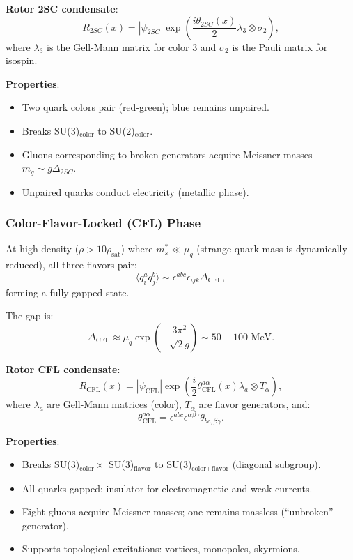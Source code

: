 \documentclass[12pt,a4paper]{article}
\theoremstyle{definition}
\theoremstyle{remark}
\begin{document}
\textbf{Rotor 2SC condensate}:
\begin{equation}
R_{2SC}(x) = |\psi_{2SC}| \exp\left(\frac{i\theta_{2SC}(x)}{2} \lambda_3 \otimes \sigma_2\right),
\end{equation}
where $\lambda_3$ is the Gell-Mann matrix for color 3 and $\sigma_2$ is the Pauli matrix for isospin.

\textbf{Properties}:
\begin{itemize}
\item Two quark colors pair (red-green); blue remains unpaired.
\item Breaks SU(3)$_{\text{color}}$ to SU(2)$_{\text{color}}$.
\item Gluons corresponding to broken generators acquire Meissner masses $m_g \sim g\Delta_{2SC}$.
\item Unpaired quarks conduct electricity (metallic phase).
\end{itemize}

\subsubsection{Color-Flavor-Locked (CFL) Phase}

At high density ($\rho > 10 \rho_{\text{sat}}$) where $m_s^* \ll \mu_q$ (strange quark mass is dynamically reduced), all three flavors pair:
\begin{equation}
\langle q_i^a q_j^b \rangle \sim \epsilon^{abc} \epsilon_{ijk} \Delta_{\text{CFL}},
\end{equation}
forming a fully gapped state.

The gap is:
\begin{equation}
\Delta_{\text{CFL}} \approx \mu_q \exp\left(-\frac{3\pi^2}{\sqrt{2} g}\right) \sim 50-100 \text{ MeV}.
\end{equation}

\textbf{Rotor CFL condensate}:
\begin{equation}
R_{\text{CFL}}(x) = |\psi_{\text{CFL}}| \exp\left(\frac{i}{2} \theta_{\text{CFL}}^{a\alpha}(x) \lambda_a \otimes T_\alpha\right),
\end{equation}
where $\lambda_a$ are Gell-Mann matrices (color), $T_\alpha$ are flavor generators, and:
\begin{equation}
\theta_{\text{CFL}}^{a\alpha} = \epsilon^{abc} \epsilon^{\alpha\beta\gamma} \theta_{bc,\beta\gamma}.
\end{equation}

\textbf{Properties}:
\begin{itemize}
\item Breaks SU(3)$_{\text{color}} \times$ SU(3)$_{\text{flavor}}$ to SU(3)$_{\text{color+flavor}}$ (diagonal subgroup).
\item All quarks gapped: insulator for electromagnetic and weak currents.
\item Eight gluons acquire Meissner masses; one remains massless (``unbroken'' generator).
\item Supports topological excitations: vortices, monopoles, skyrmions.
\end{itemize}
\end{document}

